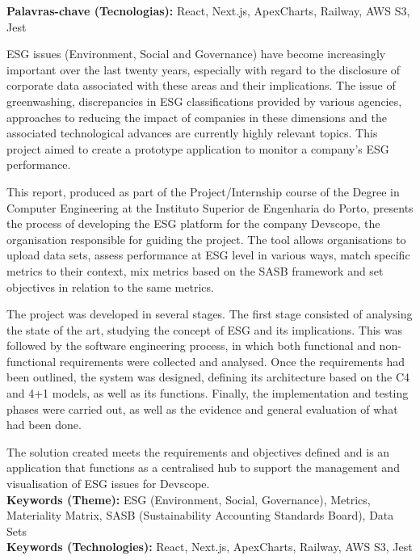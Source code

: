 \textbf{Palavras-chave (Tecnologias):} React, Next.js, ApexCharts, Railway, AWS S3, Jest

\vspace{20mm}


\begin{abstractotherlanguage}

ESG issues (Environment, Social and Governance) have become increasingly important over the last twenty years, especially with regard to the disclosure of corporate data associated with these areas and their implications. The issue of greenwashing, discrepancies in ESG classifications provided by various agencies, approaches to reducing the impact of companies in these dimensions and the associated technological advances are currently highly relevant topics. This project aimed to create a prototype application to monitor a company's ESG performance.

This report, produced as part of the Project/Internship course of the Degree in Computer Engineering at the Instituto Superior de Engenharia do Porto, presents the process of developing the ESG platform for the company Devscope, the organisation responsible for guiding the project. The tool allows organisations to upload data sets, assess performance at ESG level in various ways, match specific metrics to their context, mix metrics based on the SASB framework and set objectives in relation to the same metrics.

The project was developed in several stages. The first stage consisted of analysing the state of the art, studying the concept of ESG and its implications. This was followed by the software engineering process, in which both functional and non-functional requirements were collected and analysed. Once the requirements had been outlined, the system was designed, defining its architecture based on the C4 and 4+1 models, as well as its functions. Finally, the implementation and testing phases were carried out, as well as the evidence and general evaluation of what had been done.

The solution created meets the requirements and objectives defined and is an application that functions as a centralised hub to support the management and visualisation of ESG issues for Devscope. \\

\textbf{Keywords (Theme):}	ESG (Environment, Social, Governance), Metrics, Materiality Matrix, SASB (Sustainability Accounting Standards Board), Data Sets \\

\textbf{Keywords (Technologies):} React, Next.js, ApexCharts, Railway, AWS S3, Jest

\end{abstractotherlanguage}


